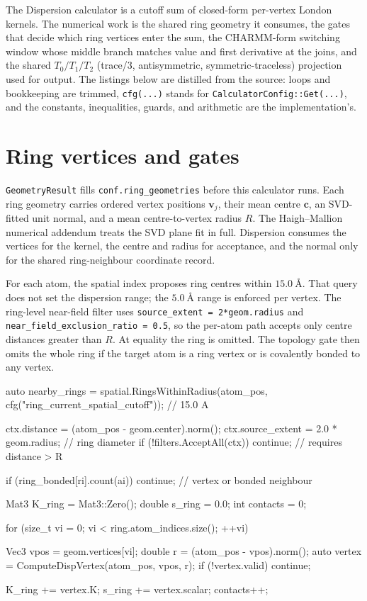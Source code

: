 \documentclass[11pt]{article}
\newcommand{\code}[1]{\texttt{#1}}
\begin{document}

The Dispersion calculator is a cutoff sum of closed-form per-vertex London
kernels. The numerical work is the shared ring geometry it consumes, the gates
that decide which ring vertices enter the sum, the CHARMM-form switching
window whose middle branch matches value and first derivative at the joins, and
the shared \(T_0/T_1/T_2\) (trace/3, antisymmetric, symmetric-traceless)
projection used for output. The listings below are
distilled from the source: loops and bookkeeping are trimmed, \code{cfg(...)}
stands for \code{CalculatorConfig::Get(...)}, and the constants, inequalities,
guards, and arithmetic are the implementation's.

\section{Ring vertices and gates}

\code{GeometryResult} fills \code{conf.ring\_geometries} before this
calculator runs. Each ring geometry carries ordered vertex positions
\(\bm v_j\), their mean centre \(\bm c\), an SVD-fitted unit normal, and a mean
centre-to-vertex radius \(R\). The Haigh--Mallion numerical addendum treats the
SVD plane fit in full. Dispersion consumes the vertices for the kernel, the
centre and radius for acceptance, and the normal only for the shared
ring-neighbour coordinate record.

For each atom, the spatial index proposes ring centres within
\(\SI{15.0}{\angstrom}\). That query does not set the dispersion range; the
\(\SI{5.0}{\angstrom}\) range is enforced per vertex. The ring-level
near-field filter uses \code{source\_extent = 2*geom.radius} and
\code{near\_field\_exclusion\_ratio = 0.5}, so the per-atom path accepts only
centre distances greater than \(R\). At equality the ring is omitted. The
topology gate then omits the whole ring if the target atom is a ring vertex or
is covalently bonded to any vertex.

\begin{codebox}
auto nearby_rings =
    spatial.RingsWithinRadius(atom_pos,
        cfg("ring_current_spatial_cutoff"));       // 15.0 A

ctx.distance = (atom_pos - geom.center).norm();
ctx.source_extent = 2.0 * geom.radius;             // ring diameter
if (!filters.AcceptAll(ctx)) continue;             // requires distance > R

if (ring_bonded[ri].count(ai)) continue;           // vertex or bonded neighbour

Mat3 K_ring = Mat3::Zero();
double s_ring = 0.0;
int contacts = 0;

for (size_t vi = 0; vi < ring.atom_indices.size(); ++vi) {
    Vec3 vpos = geom.vertices[vi];
    double r = (atom_pos - vpos).norm();
    auto vertex = ComputeDispVertex(atom_pos, vpos, r);
    if (!vertex.valid) continue;

    K_ring += vertex.K;
    s_ring += vertex.scalar;
    contacts++;
}
\end{codebox}
\end{document}
